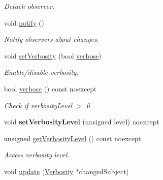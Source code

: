 \begin{DoxyCompactItemize}
\begin{DoxyCompactList}\small\item\em Detach observer. \end{DoxyCompactList}\item 
\hypertarget{classSpacy_1_1Mixin_1_1MixinConnection_a1ddeaa78a3bb4a38c2cca36d1f99fe36}{void \hyperlink{classSpacy_1_1Mixin_1_1MixinConnection_a1ddeaa78a3bb4a38c2cca36d1f99fe36}{notify} ()}\label{classSpacy_1_1Mixin_1_1MixinConnection_a1ddeaa78a3bb4a38c2cca36d1f99fe36}

\begin{DoxyCompactList}\small\item\em Notify observers about changes. \end{DoxyCompactList}\item 
void \hyperlink{classSpacy_1_1Mixin_1_1Verbosity_a0365d293ab27e27da9496c668020aefb}{set\-Verbosity} (bool \hyperlink{classSpacy_1_1Mixin_1_1Verbosity_ad367a7328578546938fd2a7e52ab3793}{verbose})
\begin{DoxyCompactList}\small\item\em Enable/disable verbosity. \end{DoxyCompactList}\item 
\hypertarget{classSpacy_1_1Mixin_1_1Verbosity_ad367a7328578546938fd2a7e52ab3793}{bool \hyperlink{classSpacy_1_1Mixin_1_1Verbosity_ad367a7328578546938fd2a7e52ab3793}{verbose} () const noexcept}\label{classSpacy_1_1Mixin_1_1Verbosity_ad367a7328578546938fd2a7e52ab3793}

\begin{DoxyCompactList}\small\item\em Check if verbosity\-Level $>$ 0. \end{DoxyCompactList}\item 
\hypertarget{classSpacy_1_1Mixin_1_1Verbosity_af84a4b3c933f252a5840ab63d4a38325}{void {\bfseries set\-Verbosity\-Level} (unsigned level) noexcept}\label{classSpacy_1_1Mixin_1_1Verbosity_af84a4b3c933f252a5840ab63d4a38325}

\item 
\hypertarget{classSpacy_1_1Mixin_1_1Verbosity_ae55b7493c53b3bb4c2770c99addb5ee1}{unsigned \hyperlink{classSpacy_1_1Mixin_1_1Verbosity_ae55b7493c53b3bb4c2770c99addb5ee1}{get\-Verbosity\-Level} () const noexcept}\label{classSpacy_1_1Mixin_1_1Verbosity_ae55b7493c53b3bb4c2770c99addb5ee1}

\begin{DoxyCompactList}\small\item\em Access verbosity level. \end{DoxyCompactList}\item 
\hypertarget{classSpacy_1_1Mixin_1_1Verbosity_a8cff860c587fcda2cdc86ba744302b33}{void \hyperlink{classSpacy_1_1Mixin_1_1Verbosity_a8cff860c587fcda2cdc86ba744302b33}{update} (\hyperlink{classSpacy_1_1Mixin_1_1Verbosity_aefe2f237b0456c4bced001fbfa75f92e}{Verbosity} $\ast$changed\-Subject)}\label{classSpacy_1_1Mixin_1_1Verbosity_a8cff860c587fcda2cdc86ba744302b33}


\end{DoxyCompactItemize}
